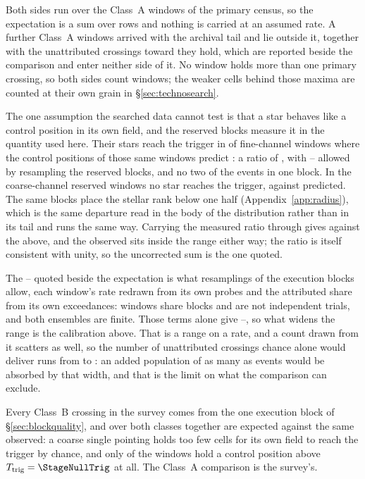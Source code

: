 Both sides run over the \CeNWin{} Class~A windows of the primary census, so
the expectation is a sum over rows and nothing is carried at an assumed rate.
A further \CeNWinTail{} Class~A windows arrived with the archival tail and lie
outside it, together with the \CeNTailCrossWord{} unattributed crossings
toward \CeTailStar{} they hold, which are reported beside the comparison and
enter neither side of it. No window holds more than one primary crossing, so
both sides count windows; the weaker cells behind those maxima are counted at
their own grain in \S\ref{sec:technosearch}.

The one assumption the searched data cannot test is that a star behaves like
a control position in its own field, and the reserved blocks measure it in
the quantity used here. Their stars reach the trigger in \StHoObs{} of
\StHoNFine{} fine-channel windows where the control positions of those same
windows predict \StHoExpFine: a ratio of \StHoRatio, with \StHoLo--\StHoHi{}
allowed by resampling the reserved blocks, and no two of the events in one
block. In the \StHoNCoarse{} coarse-channel reserved windows no star reaches
the trigger, against \StHoExpCoarse{} predicted. The same blocks place the
stellar rank below one half (Appendix~\ref{app:radius}), which is the same
departure read in the body of the distribution rather than in its tail and
runs the same way. Carrying the measured ratio through gives \CeExpX{}
against the \CeExp{} above, and the observed \CeObs{} sits inside the range
either way; the ratio is itself consistent with unity, so the uncorrected sum
is the one quoted.

The \CeLo--\CeHi{} quoted beside the expectation is what \CeNBoot{}
resamplings of the execution blocks allow, each window's rate redrawn from
its own \NCtrl{} probes and the attributed share from its own \CeNExc{}
exceedances: windows share blocks and are not independent trials, and both
ensembles are finite. Those terms alone give
\CeLoNull--\CeHiNull, so what widens the range is the calibration above.
That is a range on a rate, and a count drawn from it scatters as well, so the
number of unattributed crossings chance alone would deliver runs from
\CeCntLo{} to \CeCntHi: an
added population of as many as \CeAddBlind{} events would be absorbed by that
width, and that is the limit on what the comparison can exclude.

Every Class~B crossing in the survey comes from the one execution block of
\S\ref{sec:blockquality}, and over both classes together \CeExpSurv{} are
expected against the same \CeObs{} observed: a coarse single pointing holds
too few cells for its own field to reach the trigger by chance, and only
\NCtrlWinObs{} of the \NWindows{} windows hold a control position above
$T_{\rm trig}=\StageNullTrig$ at all. The Class~A comparison is the survey's.

